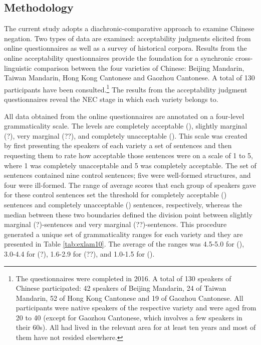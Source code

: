 \documentclass[output=paper]{langscibook}
\begin{document}
\subsection{Methodology}\label{s:lam2-2}

The current study adopts a diachronic-comparative approach to examine Chinese negation. Two types of data are examined: acceptability judgments elicited from online questionnaires as well as a survey of historical corpora. Results from the online acceptability questionnaires provide the foundation for a synchronic cross-linguistic comparison between the four varieties of Chinese: Beijing Mandarin, Taiwan Mandarin, Hong Kong Cantonese and Gaozhou Cantonese. A total of 130 participants have been consulted.\footnote{The questionnaires were completed in 2016. A total of 130 speakers of Chinese participated: 42 speakers of Beijing Mandarin, 24 of Taiwan Mandarin, 52 of Hong Kong Cantonese and 19 of Gaozhou Cantonese. All participants were native speakers of the respective variety and were aged from 20 to 40 (except for Gaozhou Cantonese, which involves a few speakers in their 60s). All had lived in the relevant area for at least ten years and most of them have not resided elsewhere.} 
The results from the acceptability judgment questionnaires reveal the NEC stage in which each variety belongs to. 

All data obtained from the online questionnaires are annotated on a four-level grammaticality scale. The levels are completely acceptable (), slightly marginal (?), very marginal (??), and completely unacceptable (\ast). 
This scale was created by first presenting the speakers of each variety a set of sentences and then requesting them to rate how acceptable those sentences were on a scale of 1 to 5, where 1 was completely unacceptable and 5 was completely acceptable. The set of sentences contained nine control sentences; five were well-formed structures, and four were ill-formed. The range of average scores that each group of speakers gave for these control sentences set the threshold for completely acceptable () sentences and completely unacceptable (\ast) sentences, respectively, whereas the median between these two boundaries defined the division point between slightly marginal (?)-sentences and very marginal (??)-sentences. This procedure generated a unique set of grammaticality ranges for each variety and they are presented in Table \ref{tab:exlam10}. The average of the ranges was 4.5-5.0 for (), 3.0-4.4 for (?), 1.6-2.9 for (??), and 1.0-1.5 for (\ast). 
\end{document}
